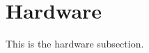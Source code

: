 \documentclass[../vccs_documentation]{subfiles}
\begin{document}
\section{Hardware}
This is the hardware subsection.
\end{document}
